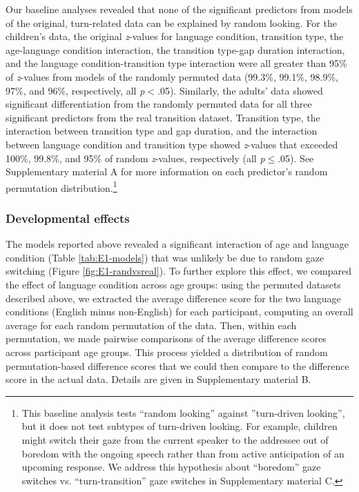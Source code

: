 \documentclass[authoryear, 12pt]{elsarticle}
\begin{document}
Our baseline analyses revealed that none of the significant predictors from models of the original, turn-related data can be explained by random looking. For the children's data, the original \textit{z}-values for language condition, transition type, the age-language condition interaction, the transition type-gap duration interaction, and the language condition-transition type interaction were all greater than 95\% of \textit{z}-values from models of the randomly permuted data (99.3\%, 99.1\%, 98.9\%, 97\%, and 96\%, respectively, all \textit{p}$<$.05). Similarly, the adults' data showed significant differentiation from the randomly permuted data for all three significant predictors from the real transition dataset. Transition type, the interaction between transition type and gap duration, and the interaction between language condition and transition type showed \textit{z}-values that exceeded 100\%, 99.8\%, and 95\% of random \textit{z}-values, respectively (all \textit{p}$\leq$.05). See Supplementary material A for more information on each predictor's random permutation distribution.\footnote{This baseline analysis tests ``random looking'' against ''turn-driven looking'', but it does not test subtypes of turn-driven looking. For example, children might switch their gaze from the current speaker to the addressee out of boredom with the ongoing speech rather than from active anticipation of an upcoming response. We address this hypothesis about ``boredom'' gaze switches vs. ``turn-transition'' gaze switches in Supplementary material C.}


\subsubsection*{Developmental effects}

The models reported above revealed a significant interaction of age and language condition (Table \ref{tab:E1-models}) that was unlikely be due to random gaze switching (Figure \ref{fig:E1-randvsreal}). To further explore this effect, we compared the effect of language condition across age groups: using the permuted datasets described above, we extracted the average difference score for the two language conditions (English minus non-English) for each participant, computing an overall average for each random permutation of the data. Then, within each permutation, we made pairwise comparisons of the average difference scores across participant age groups. This process yielded a distribution of random permutation-based difference scores that we could then compare to the difference score in the actual data. Details are given in Supplementary material B.
\end{document}
